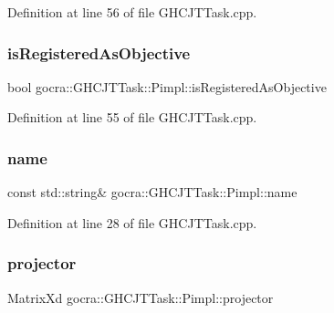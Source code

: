 Definition at line 56 of file G\+H\+C\+J\+T\+Task.\+cpp.

\hypertarget{structgocra_1_1GHCJTTask_1_1Pimpl_ac3772fc7a816ef1ba5ac40b79908d225}{}\label{structgocra_1_1GHCJTTask_1_1Pimpl_ac3772fc7a816ef1ba5ac40b79908d225} 
\subsubsection{\texorpdfstring{is\+Registered\+As\+Objective}{isRegisteredAsObjective}}
{\footnotesize\ttfamily bool gocra\+::\+G\+H\+C\+J\+T\+Task\+::\+Pimpl\+::is\+Registered\+As\+Objective}



Definition at line 55 of file G\+H\+C\+J\+T\+Task.\+cpp.

\hypertarget{structgocra_1_1GHCJTTask_1_1Pimpl_a62bf1c09164be6cf8a48360bd6e53d64}{}\label{structgocra_1_1GHCJTTask_1_1Pimpl_a62bf1c09164be6cf8a48360bd6e53d64} 
\subsubsection{\texorpdfstring{name}{name}}
{\footnotesize\ttfamily const std\+::string\& gocra\+::\+G\+H\+C\+J\+T\+Task\+::\+Pimpl\+::name}



Definition at line 28 of file G\+H\+C\+J\+T\+Task.\+cpp.

\hypertarget{structgocra_1_1GHCJTTask_1_1Pimpl_ab17e7af214e9801bfb03e4d9ed6dad29}{}\label{structgocra_1_1GHCJTTask_1_1Pimpl_ab17e7af214e9801bfb03e4d9ed6dad29} 
\subsubsection{\texorpdfstring{projector}{projector}}
{\footnotesize\ttfamily Matrix\+Xd gocra\+::\+G\+H\+C\+J\+T\+Task\+::\+Pimpl\+::projector}



